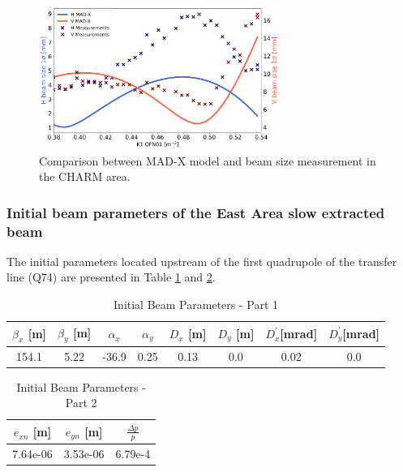 \begin{figure}[htbp]
\centering
\includegraphics[width=0.7\textwidth]{03_Empirical_Measurements/images/east_quad_scan_df_meas_btv96.pickle.png}
\caption{Comparison between MAD-X model and beam size measurement in the CHARM area.}
\label{fig:comparison_btv96}
\end{figure}


\newpage
\subsubsection{Initial beam parameters of the East Area slow extracted beam}

The initial parameters located upstream of the first quadrupole of the transfer line (Q74) are presented in Table \ref{table:beam_parameters_1} and \ref{table:beam_parameters_2}.


\begin{table}[htbp]
\centering
\caption{Initial Beam Parameters - Part 1}
\label{table:beam_parameters_1}
\begin{tabular}{|c|c|c|c|c|c|c|c|}
\hline
$\beta_{x}$ [m] & $\beta_{y}$ [m] & $\alpha_{x}$ & $\alpha_{y}$ & $D_{x}$ [m] & $D_{y}$ [m] & $D^{'}_{x}$[mrad] & $D^{'}_{y}$[mrad] \\
\hline
154.1 & 5.22 & -36.9 & 0.25 & 0.13 & 0.0 & 0.02 & 0.0 \\
\hline
\end{tabular}
\end{table}

\begin{table}[htbp]
\centering
\caption{Initial Beam Parameters - Part 2}
\label{table:beam_parameters_2}
\begin{tabular}{|c|c|c|}
\hline
$e_{xn}$ [m] & $e_{yn}$ [m] & $\frac{\Delta p}{p}$ \\
\hline
7.64e-06 & 3.53e-06 & 6.79e-4 \\
\hline
\end{tabular}
\end{table}


